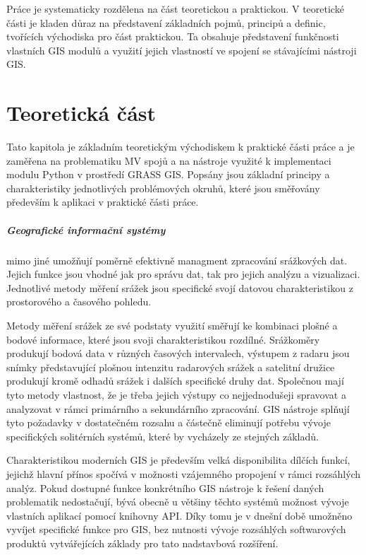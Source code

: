 \documentclass[a4paper,12pt,oneside]{report}
\begin{document}
Práce je systematicky rozdělena na část teoretickou a praktickou. V
teoretické části je kladen důraz na představení základních pojmů,
principů a definic, tvořících východiska pro část praktickou. Ta
obsahuje představení funkčnosti vlastních GIS modulů a využití jejich
vlastností ve spojení se stávajícími nástroji GIS.

 



\newpage
\chapter*{Teoretická
  část}
Tato kapitola je základním teoretickým východiskem k praktické části práce a je zaměřena na problematiku MV spojů a na nástroje využité k implementaci modulu Python v prostředí GRASS GIS. Popsány jsou základní principy a charakteristiky jednotlivých problémových okruhů, které jsou směřovány především  k aplikaci v praktické části práce.



\paragraph*{Geografické informační systémy} mimo jiné umožňují poměrně efektivně
managment zpracování sráž\-kových dat. Jejich funkce jsou vhodné jak pro správu
dat, tak pro jejich analýzu a vizualizaci. Jednotlivé metody měření
srážek jsou specifické svojí datovou charakteristikou z prostorového a
časového pohledu.

Metody měření srážek ze své podstaty využití směřují ke kombinaci
plošné a bodové informace, které jsou svoji charakteristikou
rozdílné. Srážkoměry produkují bodová data v různých časových
intervalech, výstupem z radaru jsou snímky představující plošnou
intenzitu radarových srážek a satelitní družice produkují kromě odhadů
srážek i dalších specifické druhy dat. Společnou mají tyto metody
vlastnost, že je třeba jejich výstupy co nejjednodušeji spravovat a
analyzovat v rámci primárního a sekundárního zpracování. GIS nástroje
splňují tyto požadavky v dostatečném rozsahu a částečně eliminují
potřebu vývoje specifických solitérních systémů, které by vycházely ze
stejných základů.

Charakteristikou moderních GIS je především velká disponibilita
dílčích funkcí, jejichž hlavní přínos spočívá  v možnosti vzájemného propojení v
rámci rozsáhlých analýz. Pokud dostupné funkce konkrétního GIS nástroje
k řešení daných problematik nedostačují, bývá obecně u většiny těchto
systémů možnost vývoje vlastních aplikací pomocí knihovny
  \acs{API}. Díky tomu je v dnešní době umožněno vyvíjet specifické
funkce pro GIS, bez nutnosti vývoje rozsáhlých softwarových produktů
vytvářejících základy pro tato nadstavbová rozšíření.
\end{document}
